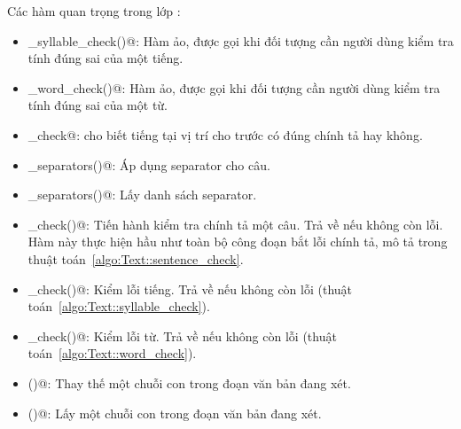 \documentclass[a4paper,oneside,14pt]{extbook} %
\begin{document}
Các hàm quan trọng trong lớp \verb@Text@:
\begin{itemize}
\item \verb@ui_syllable_check()@: Hàm ảo, được gọi khi đối tượng cần
  người dùng kiểm tra tính đúng sai của một tiếng.
\item \verb@ui_word_check()@: Hàm ảo, được gọi khi đối tượng cần người
  dùng kiểm tra tính đúng sai của một từ.
\item \verb@syllabel_check@: cho biết tiếng tại vị trí cho trước có
  đúng chính tả hay không.
\item \verb@apply_separators()@: Áp dụng separator cho câu.
\item \verb@get_separators()@: Lấy danh sách separator.
\item \verb@sentence_check()@: Tiến hành kiểm tra chính tả một
  câu. Trả về \verb@true@ nếu không còn lỗi. Hàm này thực hiện hầu như
  toàn bộ công đoạn bắt lỗi chính tả, mô tả trong thuật
  toán~\ref{algo:Text::sentence_check}.
\item \verb@syllable_check()@: Kiểm lỗi tiếng. Trả về \verb@true@ nếu
  không còn lỗi (thuật toán~\ref{algo:Text::syllable_check}).
\item \verb@word_check()@: Kiểm lỗi từ. Trả về \verb@true@ nếu
  không còn lỗi (thuật toán~\ref{algo:Text::word_check}).
\item \verb@replace()@: Thay thế một chuỗi con trong đoạn văn bản đang
  xét.
\item \verb@substr()@: Lấy một chuỗi con trong đoạn văn bản đang xét.
\end{itemize}
\end{document}
